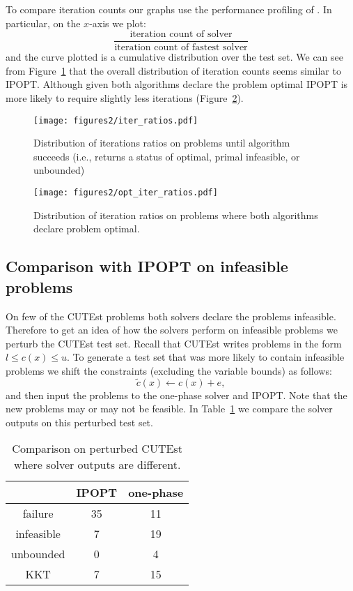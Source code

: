 \documentclass{article}
\begin{document}
To compare iteration counts our graphs use the performance profiling of \citet*{dolan2002benchmarking}. In particular, on the $x$-axis we plot:
$$
\frac{\text{iteration count of solver}}{\text{iteration count of fastest solver}}
$$
and the curve plotted is a cumulative distribution over the test set. We can see from Figure~\ref{fig:iter-count-CUTEst} that the overall distribution of iteration counts seems similar to IPOPT. Although given both algorithms declare the problem optimal IPOPT is more likely to require slightly less iterations (Figure~\ref{fig:iter-count-CUTEst-opt}).

\begin{figure}[H]
\texttt{[image: figures2/iter\_ratios.pdf]}
\caption{Distribution of iterations ratios on problems until algorithm succeeds (i.e., returns a status of optimal, primal infeasible, or unbounded)}\label{fig:iter-count-CUTEst}
\end{figure}

\begin{figure}[H]
\texttt{[image: figures2/opt\_iter\_ratios.pdf]}
\caption{Distribution of iteration ratios on problems where both algorithms declare problem optimal.}\label{fig:iter-count-CUTEst-opt}
\end{figure}




\subsection{Comparison with IPOPT on infeasible problems}\label{sec:infeas}


On few of the CUTEst problems both solvers declare the problems infeasible. Therefore to get an idea of how the solvers perform on infeasible problems we perturb the CUTEst test set. Recall that CUTEst writes problems in the form $l \le c(x) \le u$. To generate a test set that was more likely to contain infeasible problems we shift the constraints (excluding the variable bounds) as follows:
$$
\tilde{c}(x) \gets c(x) + e,
$$
and then input the problems to the one-phase solver and IPOPT. Note that the new problems may or may not be feasible. In Table~\ref{table-perturbed-solver-output} we compare the solver outputs on this perturbed test set. 

\begin{table}[H]
\caption{Comparison on perturbed CUTEst where solver outputs are different.}\label{table-perturbed-solver-output}
\begin{tabular}{| c | c | c |}
& IPOPT & one-phase \\
\hline
failure &  35 & 11 \\ 
infeasible & 7 & 19 \\  
unbounded & 0 & 4 \\
KKT & 7 & 15 
\end{tabular}
\end{table}
\end{document}

